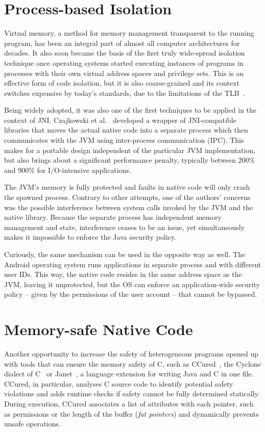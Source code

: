 \documentclass[a4paper,12pt,twoside,openright]{report}
\begin{document}
\section{Process-based Isolation}

Virtual memory, a method for memory management transparent to the running program, has been an integral part of almost all computer architectures for decades. It also soon became the basis of the first truly wide-spread isolation technique once operating systems started executing instances of programs in processes with their own virtual address spaces and privilege sets. This is an effective form of code isolation, but it is also coarse-grained and its context switches expensive by today's standards, due to the limitations of the TLB~\cite{basu2012reducing}. 

Being widely adopted, it was also one of the first techniques to be applied in the context of JNI. Czajkowski et al.~\cite{989483} developed a wrapper of JNI-compatible libraries that moves the actual native code into a separate process which then communicates with the JVM using inter-process communication (IPC). This makes for a portable design independent of the particular JVM implementation, but also brings about a significant performance penalty, typically between 200\% and 900\% for I/O-intensive applications.

The JVM's memory is fully protected and faults in native code will only crash the spawned process. Contrary to other attempts, one of the authors' concerns was the possible interference between system calls invoked by the JVM and the native library. Because the separate process has independent memory management and state, interference ceases to be an issue, yet simultaneously makes it impossible to enforce the Java security policy.

Curiously, the same mechanism can be used in the opposite way as well. The Android operating system runs applications in separate process and with different user IDs. This way, the native code resides in the same address space as the JVM, leaving it unprotected, but the OS can enforce an application-wide security policy -- given by the permissions of the user account -- that cannot be bypassed.

\section{Memory-safe Native Code}

Another opportunity to increase the safety of heterogeneous programs opened up with tools that can ensure the memory safety of C, such as CCured~\cite{necula2002ccured, Condit:2003:CRW:781131.781157}, the Cyclone dialect of C~\cite{Jim:2002:CSD:647057.713871} or Janet~\cite{Bubak:2001:CJN:1239921.1239925}, a language extension for writing Java and C in one file. CCured, in particular, analyses C source code to identify potential safety violations and adds runtime checks if safety cannot be fully determined statically. During execution, CCured associates a list of attributes with each pointer, such as permissions or the length of the buffer (\emph{fat pointers}) and dynamically prevents unsafe operations. 
\end{document}

